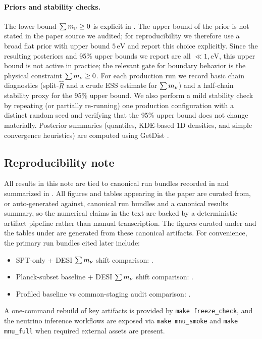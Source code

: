 \paragraph{Priors and stability checks.}
The lower bound $\sum m_\nu\ge 0$ is explicit in \cite{arxiv2601_16277}. The upper bound of the prior is not stated in the paper source we audited; for reproducibility we therefore use a broad flat prior with upper bound $5\,\mathrm{eV}$ and report this choice explicitly. Since the resulting posteriors and 95\% upper bounds we report are all $\ll 1,\mathrm{eV}$, this upper bound is not active in practice; the relevant gate for boundary behavior is the physical constraint $\sum m_\nu\ge 0$. For each production run we record basic chain diagnostics (split-$\hat R$ \cite{gelman_rubin1992,vehtari2021_rhat} and a crude ESS estimate \cite{vehtari2021_rhat} for $\sum m_\nu$) and a half-chain stability proxy for the 95\% upper bound. We also perform a mild stability check by repeating (or partially re-running) one production configuration with a distinct random seed and verifying that the 95\% upper bound does not change materially.
Posterior summaries (quantiles, KDE-based 1D densities, and simple convergence heuristics) are computed using GetDist \cite{getdist}.

\subsection{Reproducibility note}
\label{sec:reproducibility}

All results in this note are tied to canonical run bundles recorded in  and summarized in .
All figures and tables appearing in the paper are curated from, or auto-generated against, canonical run bundles and a canonical results summary, so the numerical claims in the text are backed by a deterministic artifact pipeline rather than manual transcription.
The figures curated under  and the tables under  are generated from these canonical artifacts. For convenience, the primary run bundles cited later include:
\begin{itemize}[leftmargin=*, itemsep=2pt]
  \item SPT-only + DESI $\sum m_\nu$ shift comparison: .
  \item Planck-subset baseline + DESI $\sum m_\nu$ shift comparison: .
  \item Profiled baseline vs common-staging audit comparison: .
\end{itemize}
A one-command rebuild of key artifacts is provided by \texttt{make freeze\_check}, and the neutrino inference workflows are exposed via \texttt{make mnu\_smoke} and \texttt{make mnu\_full} when required external assets are present.
